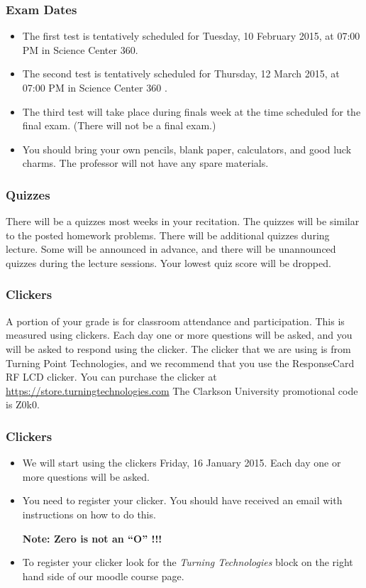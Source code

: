 \begin{frame}
  \frametitle{Exam Dates}

  \begin{itemize}
  \item The first test is tentatively scheduled for Tuesday, 10
    February 2015, at 07:00 PM in Science Center 360. 
  \item The second test is tentatively scheduled for Thursday, 12
    March 2015, at 07:00 PM in Science Center 360 . 
  \item The third test will take place during finals week at the time
    scheduled for the final exam. (There will not be a final exam.)
  \item You should bring your own pencils, blank paper, calculators,
    and good luck charms.  The professor will not have any spare
    materials.
  \end{itemize}

\end{frame}

\begin{frame}
  \frametitle{Quizzes}

  There will be a quizzes most weeks in your recitation. The quizzes
  will be similar to the posted homework problems. There will be
  additional quizzes during lecture. Some will be announced in
  advance, and there will be unannounced quizzes during the lecture
  sessions.  Your lowest quiz score will be dropped.


\end{frame}


\begin{frame}
  \frametitle{Clickers}

  A portion of your grade is for classroom attendance and
  participation. This is measured using clickers. Each day one or more
  questions will be asked, and you will be asked to respond using the
  clicker. The clicker that we are using is from Turning Point
  Technologies, and we recommend that you use the ResponseCard RF LCD
  clicker. You can purchase the clicker at
  \url{https://store.turningtechnologies.com} The Clarkson University
  promotional code is Z0k0.

\end{frame}

\begin{frame}
  \frametitle{Clickers}

  \begin{itemize}
  \item We will start using the clickers Friday, 16 January 2015. Each
    day one or more questions will be asked.

  \item You need to register your clicker. You should have received an
    email with instructions on how to do this.

    \textbf{Note: Zero is not an ``O'' !!!}

  \item To register your clicker look for the \textit{Turning
      Technologies} block on the right hand side of our moodle course
    page.
  \end{itemize}
\end{frame}



